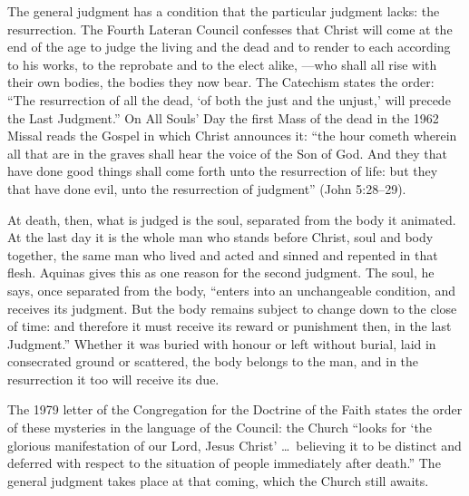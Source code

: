 The general judgment has a condition that the particular judgment lacks: the resurrection. The Fourth Lateran Council confesses that Christ will come at the end of the age to judge the living and the dead and to render to each according to his works, to the reprobate and to the elect alike, ---who shall all rise with their own bodies, the bodies they now bear. The Catechism states the order: ``The resurrection of all the dead, `of both the just and the unjust,' will precede the Last Judgment.'' On All Souls' Day the first Mass of the dead in the 1962 Missal reads the Gospel in which Christ announces it: ``the hour cometh wherein all that are in the graves shall hear the voice of the Son of God. And they that have done good things shall come forth unto the resurrection of life: but they that have done evil, unto the resurrection of judgment'' (John 5:28--29).

At death, then, what is judged is the soul, separated from the body it animated. At the last day it is the whole man who stands before Christ, soul and body together, the same man who lived and acted and sinned and repented in that flesh. Aquinas gives this as one reason for the second judgment. The soul, he says, once separated from the body, ``enters into an unchangeable condition, and receives its judgment. But the body remains subject to change down to the close of time: and therefore it must receive its reward or punishment then, in the last Judgment.'' Whether it was buried with honour or left without burial, laid in consecrated ground or scattered, the body belongs to the man, and in the resurrection it too will receive its due.

The 1979 letter of the Congregation for the Doctrine of the Faith states the order of these mysteries in the language of the Council: the Church ``looks for `the glorious manifestation of our Lord, Jesus Christ' \ldots\ believing it to be distinct and deferred with respect to the situation of people immediately after death.'' The general judgment takes place at that coming, which the Church still awaits.

